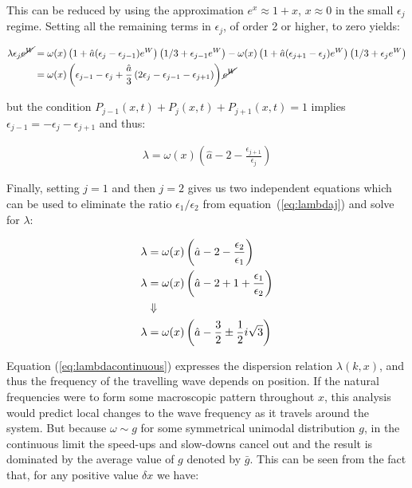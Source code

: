 \noindent This can be reduced by using the approximation $e^x \approx 1 + x$, $x\approx 0$ in the small $\epsilon_j$ regime. Setting
all the remaining terms in $\epsilon_j$, of order 2 or higher, to zero yields:

\begin{align}
  \lambda \epsilon_j\cancel{e^W} &= \omega(x)\left(1+\hat{a}(\epsilon_j-\epsilon_{j-1})e^W\right)\left(1/3+\epsilon_{j-1}e^W\right)
  - \omega(x)\left(1+\hat{a}(\epsilon_{j+1}-\epsilon_j)e^W\right)\left(1/3+\epsilon_je^W\right) \notag \\
  &= \omega(x)\left( \epsilon_{j-1} - \epsilon_j + \frac{\hat{a}}{3}\left( 2\epsilon_j - \epsilon_{j-1} - \epsilon_{j+1} \right) \right)\cancel{e^W} \notag
\end{align}

\noindent but the condition $P_{j-1}(x,t)+P_j(x,t)+P_{j+1}(x,t)=1$ implies $\epsilon_{j-1}=-\epsilon_j-\epsilon_{j+1}$ and thus:

\begin{align}
  \lambda = \omega(x)\left( \hat{a}-2 - \frac{\epsilon_{j+1}}{\epsilon_j} \right)
  \label{eq:lambdaj}
\end{align}

Finally, setting $j=1$ and then $j=2$ gives us two independent equations which can be used to eliminate the ratio
$\epsilon_1/\epsilon_2$ from equation~(\ref{eq:lambdaj}) and solve for $\lambda$:

\begin{align}
  \lambda &= \omega(x)\left( \hat{a} - 2 - \frac{\epsilon_2}{\epsilon_1} \right) \notag \\
  \lambda &= \omega(x)\left( \hat{a} - 2 + 1 + \frac{\epsilon_1}{\epsilon_2} \right) \notag \\
  &\Downarrow \notag \\
  \lambda &= \omega(x)\left( \hat{a} - \frac{3}{2} \pm \frac{1}{2}i\sqrt{3} \right)
  \label{eq:lambdacontinuous}
\end{align}

Equation (\ref{eq:lambdacontinuous}) expresses the dispersion relation $\lambda(k,x)$, and thus the frequency of the travelling wave
depends on position. If the natural frequencies were to form some macroscopic pattern throughout $x$, this analysis would predict local
changes to the wave frequency as it travels around the system. But because $\omega \sim g$ for some symmetrical unimodal distribution
$g$, in the continuous limit the speed-ups and slow-downs cancel out and the result is dominated by the average value of $g$ denoted by
$\bar{g}$. This can be seen from the fact that, for any positive value $\delta x$ we have:

